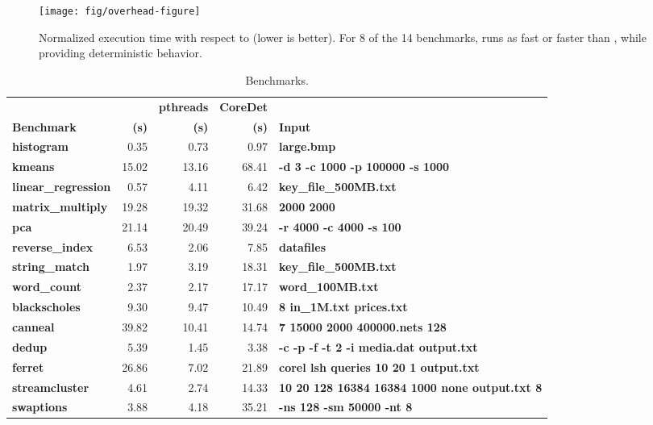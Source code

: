 \label{sec:evaluation}

\begin{figure*}[!t]
{\centering
\texttt{[image: fig/overhead-figure]}
\caption{Normalized execution time with respect to \pthreads{} (lower is better). For 8 of the 14 benchmarks, \dthreads{} runs as fast or faster than \pthreads{}, while providing deterministic behavior.\label{fig:performance}}
}
\end{figure*}

\begin{table*}[!t]
\centering
\begin{tabular}{|l|rrr|l|}
\hline
 & {\bf \small \dthreads{} } & {\bf \small pthreads} & {\bf \small CoreDet} &  \\
{\bf \small Benchmark} & {\bf \small (s)} & {\bf \small (s) } & {\bf \small (s)} & {\bf \small Input} \\
\hline
{\bf \small histogram} & 0.35 & 0.73 & 0.97 & {\bf \small large.bmp} \\
{\bf \small kmeans} & 15.02 & 13.16 & 68.41 & {\bf \small -d 3 -c 1000 -p 100000 -s 1000} \\ 
{\bf \small linear\_regression} & 0.57 & 4.11 & 6.42 &  {\bf \small key\_file\_500MB.txt} \\
{\bf \small matrix\_multiply} & 19.28 & 19.32 & 31.68 & {\bf \small 2000 2000 } \\
{\bf \small pca} & 21.14 & 20.49 & 39.24 & {\bf \small -r 4000 -c 4000 -s 100 } \\
{\bf \small reverse\_index} & 6.53 & 2.06 & 7.85 & {\bf \small datafiles} \\
{\bf \small string\_match} & 1.97 & 3.19 & 18.31 & {\bf \small key\_file\_500MB.txt} \\
{\bf \small word\_count} & 2.37 & 2.17 & 17.17 & {\bf \small word\_100MB.txt} \\
{\bf \small blackscholes} & 9.30 & 9.47 & 10.49 & {\bf \small 8 in\_1M.txt prices.txt} \\
{\bf \small canneal} & 39.82 & 10.41 & 14.74 & {\bf \small 7 15000 2000 400000.nets 128} \\
{\bf \small dedup} & 5.39 & 1.45 & 3.38 & {\bf \small -c -p -f -t 2 -i media.dat output.txt} \\
{\bf \small ferret} & 26.86 & 7.02 & 21.89 & {\bf \small corel lsh queries 10 20 1 output.txt} \\
{\bf \small streamcluster} & 4.61 & 2.74 & 14.33 & {\bf \small 10 20 128 16384 16384 1000 none output.txt 8} \\
{\bf \small swaptions} & 3.88 & 4.18 & 35.21 & {\bf \small -ns 128 -sm 50000 -nt 8} \\
\hline
\end{tabular}
\caption{Benchmarks.\label{tbl:benchmarks}}
\end{table*}

